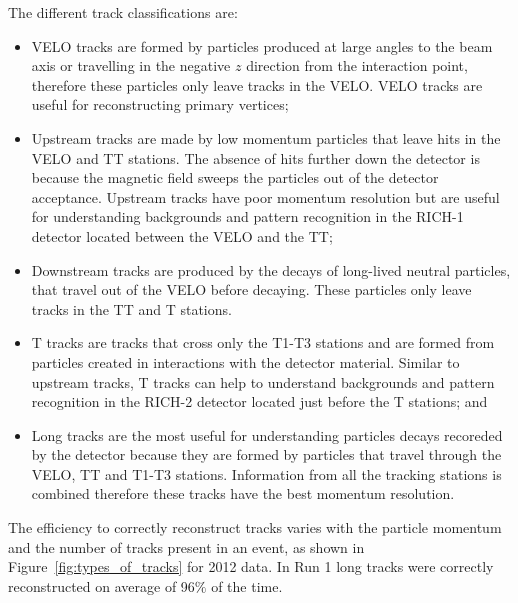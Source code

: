 The different track classifications are:
\begin{itemize}
\item  VELO tracks are formed by particles produced at large angles to the beam axis or travelling in the negative $z$ direction from the interaction point, therefore these particles only leave tracks in the VELO. VELO tracks are useful for reconstructing primary vertices;  
\item Upstream tracks are made by low momentum particles that leave hits in the VELO and TT stations. The absence of hits further down the detector is because the magnetic field sweeps the particles out of the detector acceptance. Upstream tracks have poor momentum resolution but are useful for understanding backgrounds and pattern recognition in the RICH-1 detector located between the VELO and the TT;
\item Downstream tracks are produced by the decays of long-lived neutral particles, that travel out of the VELO before decaying. These particles only leave tracks in the TT and T stations. 
\item T tracks are tracks that cross only the T1-T3 stations and are formed from particles created in interactions with the detector material. Similar to upstream tracks, T tracks can help to understand backgrounds and pattern recognition in the RICH-2 detector located just before the T stations; and
\item Long tracks are the most useful for understanding particles decays recoreded by the detector because they are formed by particles that travel through the VELO, TT and T1-T3 stations. Information from all the tracking stations is combined therefore these tracks have the best momentum resolution.
\end{itemize}



The efficiency to correctly reconstruct tracks varies with the particle momentum and the number of tracks present in an event, as shown in Figure~\ref{fig:types_of_tracks} for 2012 data. In Run 1 long tracks were correctly reconstructed on average of 96$\%$ of the time.





